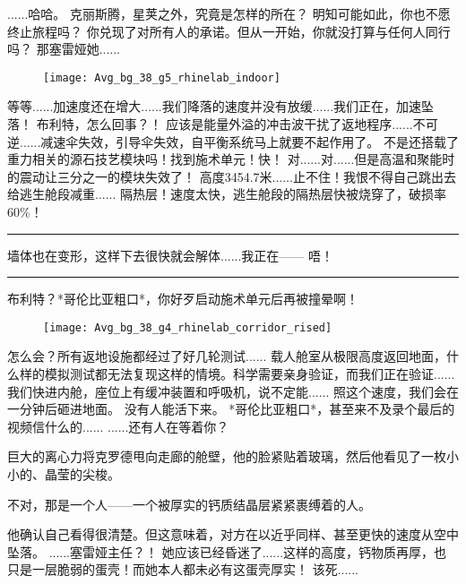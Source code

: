 \documentclass[openany]{book}
\begin{document}
\begin{dialogue}
     ......哈哈。
     克丽斯腾，星荚之外，究竟是怎样的所在？
     明知可能如此，你也不愿终止旅程吗？
     你兑现了对所有人的承诺。但从一开始，你就没打算与任何人同行吗？
     那塞雷娅她......
    \begin{figure}[h]
        \centering
        \texttt{[image: Avg\_bg\_38\_g5\_rhinelab\_indoor]}
    \end{figure}
     等等......加速度还在增大......我们降落的速度并没有放缓......我们正在，加速坠落！
     布利特，怎么回事？！
     应该是能量外溢的冲击波干扰了返地程序......不可逆......减速伞失效，引导伞失效，自平衡系统马上就要不起作用了。
     不是还搭载了重力相关的源石技艺模块吗！找到施术单元！快！
     对......对......但是高温和聚能时的震动让三分之一的模块失效了！
     高度3454.7米......止不住！我恨不得自己跳出去给逃生舱段减重......
     隔热层！速度太快，逃生舱段的隔热层快被烧穿了，破损率60\%！
    \par\noindent\rule{\textwidth}{0.4pt}
     墙体也在变形，这样下去很快就会解体......我正在——
     唔！
    \par\noindent\rule{\textwidth}{0.4pt}
     布利特？*哥伦比亚粗口*，你好歹启动施术单元后再被撞晕啊！
    \begin{figure}[h]
        \centering
        \texttt{[image: Avg\_bg\_38\_g4\_rhinelab\_corridor\_rised]}
    \end{figure}
     怎么会？所有返地设施都经过了好几轮测试......
     载人舱室从极限高度返回地面，什么样的模拟测试都无法复现这样的情境。科学需要亲身验证，而我们正在验证......
     我们快进内舱，座位上有缓冲装置和呼吸机，说不定能......
     照这个速度，我们会在一分钟后砸进地面。
     没有人能活下来。
     *哥伦比亚粗口*，甚至来不及录个最后的视频信什么的......
     ......还有人在等着你？\par
    巨大的离心力将克罗德甩向走廊的舱壁，他的脸紧贴着玻璃，然后他看见了一枚小小的、晶莹的尖梭。\par
    不对，那是一个人——一个被厚实的钙质结晶层紧紧裹缚着的人。\par
    他确认自己看得很清楚。但这意味着，对方在以近乎同样、甚至更快的速度从空中坠落。
     ......塞雷娅主任？！
     她应该已经昏迷了......这样的高度，钙物质再厚，也只是一层脆弱的蛋壳！而她本人都未必有这蛋壳厚实！
     该死......
\end{dialogue}\par
\end{document}
